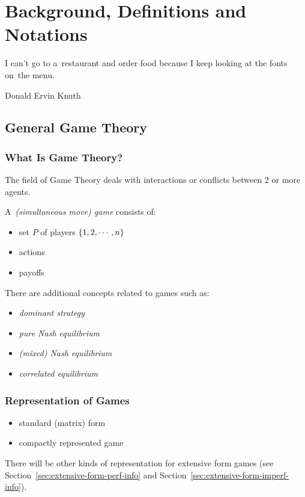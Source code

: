 \chapter{Background, Definitions and Notations}
\epigraph{
  I can't go to a~restaurant and order food because I keep looking at the fonts on~the menu.
}{Donald Ervin Knuth}

\section{General Game Theory}

\subsection{What Is Game Theory?}

The field of Game Theory deals with interactions or conflicts between $2$ or more agents.
\todo

A~\emph{(simultaneous move) game} consists of: \todo
\begin{itemize}
  \item set $P$ of players $\left\{ 1, 2, \cdots, n \right\}$
  \item actions
  \item payoffs
\end{itemize}

There are additional concepts related to games such as: \todo
\begin{itemize}
  \item \emph{dominant strategy}
  \item \emph{pure Nash equilibrium}
  \item \emph{(mixed) Nash equilibrium}
  \item \emph{correlated equilibrium}
\end{itemize}

\subsection{Representation of Games}

\todo
\begin{itemize}
  \item standard (matrix) form
  \item compactly represented game
\end{itemize}

There will be other kinds of representation for extensive form games (see Section~\ref{sec:extensive-form-perf-info} and Section~\ref{sec:extensive-form-imperf-info}).

